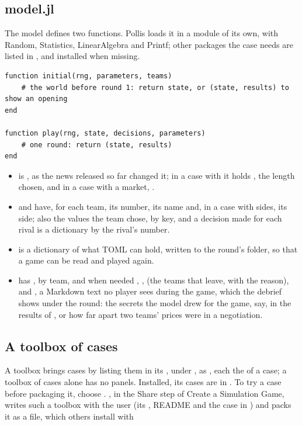 \subsection{model.jl}
The model defines two functions. Pollis loads it in a module of its own, with Random, Statistics, LinearAlgebra and
Printf; other packages the case needs are listed in , and installed when missing.
\begin{lstlisting}
function initial(rng, parameters, teams)
    # the world before round 1: return state, or (state, results) to show an opening
end

function play(rng, state, decisions, parameters)
    # one round: return (state, results)
end
\end{lstlisting}
\begin{itemize}
  \item {} is \file{[parameters]}, as the news released so far changed it; in a case with
     it holds , the length chosen, and in a case with a market, .
  \item {} and  have, for each team, its number, its name and, in a case with sides, its
    side;  also the values the team chose, by key, and a decision made for each rival is a
    dictionary by the rival's number.
  \item {} is a dictionary of what TOML can hold, written to the round's folder, so that a game can be
    read and played again.
  \item {} has ,  by team, and when needed , ,
     (the teams that leave, with the reason),  and , a Markdown text no player
    sees during the game, which the debrief shows under the round: the secrets the model drew for the game, say, in
    the results of , or how far apart two teams' prices were in a negotiation.
\end{itemize}

\subsection{A toolbox of cases}
A toolbox brings cases by listing them in its , under , as ,
each the  of a case; a toolbox of cases alone has no panels. Installed, its cases are in
. To try a case before packaging it, choose . , in the Share step of Create a Simulation Game, writes such a toolbox with the user (its ,
README and the case in ) and packs it as a  file, which others install with

